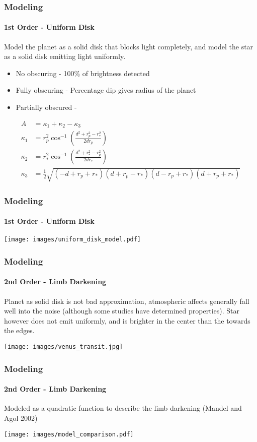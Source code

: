 \documentclass{beamer}
\begin{document}
  \begin{frame}
    \frametitle{Modeling}
    \framesubtitle{1st Order - Uniform Disk}
    Model the planet as a solid disk that blocks light completely, and model the star as a solid disk emitting light uniformly.
    \begin{itemize}
        \item No obscuring - 100\% of brightness detected
        \item Fully obscuring - Percentage dip gives radius of the planet
        \item Partially obscured -
    \end{itemize}
    \small
    \begin{align*}
    A &= \kappa_1 + \kappa_2 - \kappa_3 \\
    \kappa_1 &= r_p^2\cos^{-1}\left(\frac{d^2 + r_p^2 - r_*^2}{2dr_p}\right)\\
    \kappa_2 &= r_*^2\cos^{-1}\left(\frac{d^2 + r_*^2 - r_p^2}{2dr_*}\right)\\
        \kappa_3 &= \frac{1}{2}\sqrt{(-d + r_p + r_*)(d + r_p - r_*)(d - r_p + r_*)(d + r_p + r_*)}
    \end{align*}
  \end{frame}
  \begin{frame}
  \frametitle{Modeling}
    \framesubtitle{1st Order - Uniform Disk}
    \begin{center}
    \texttt{[image: images/uniform\_disk\_model.pdf]}
    \end{center}
  \end{frame}
  \begin{frame}
  \frametitle{Modeling}
    \framesubtitle{2nd Order - Limb Darkening}
    Planet as solid disk is not bad approximation, atmospheric affects generally fall well into the noise (although some studies have determined properties).
    Star however does not emit uniformly, and is brighter in the center than the towards the edges.
    \begin{center}
    \texttt{[image: images/venus\_transit.jpg]}
    \end{center}
  \end{frame}
  \begin{frame}
  \frametitle{Modeling}
    \framesubtitle{2nd Order - Limb Darkening}
    Modeled as a quadratic function to describe the limb darkening (Mandel and Agol 2002)
    \begin{center}
    \texttt{[image: images/model\_comparison.pdf]}
    \end{center}
  \end{frame}
\end{document}
